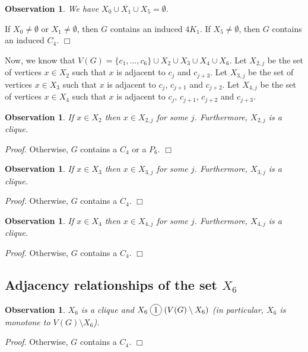 \documentclass[12pt]{article}
\newcommand*\circled[1]{\tikz[baseline=(char.base)]{
		\node[shape=circle,draw,inner sep=2pt] (char) {#1};}}
\newtheorem{Observation}[Theorem]{Observation}
\newcommand{\join}{\; \circled{1} \;}
\newcommand{\qed}{\hfill $\Box$}
\begin{document}
	
	\begin{Observation}\label{obs:X-empty}
		We have $X_0 \cup X_1 \cup X_5 = \emptyset$. 
	\end{Observation}
	 If $X_0 \not= \emptyset$ or $X_1 \not= \emptyset$, then $G$ contains an induced $4K_1$. If $X_5 \not= \emptyset$, then $G$ contains an induced $C_4$. \qed
	
	Now, we know that $V(G) = \{c_1, \dots, c_6\} \cup  X_2 \cup X_3 \cup X_4 \cup X_6$.  Let $X_{2, j}$ be the set  of vertices  $x \in X_2$ such that $x$ is adjacent to  $c_j$ and $c_{j+3}$.  Let $X_{3,j}$ be the set of vertices $x \in X_3$ such that $x$ is adjacent to  $c_j$, $c_{j+1}$ and  $c_{j+2}$.  Let $X_{4,j}$ be the set of vertices $x \in X_4$ such that $x$ is adjacent to  $c_j$, $c_{j+1}$, $c_{j+2}$ and $c_{j+3}$. 
	
	\begin{Observation}\label{obs:X2}
		If $x \in X_2$ then $x \in X_{2,j}$ for some $j$. Furthermore, $X_{2,j}$ is a clique. 
	\end{Observation}
	{\it Proof.} Otherwise, $G$ contains a $C_4$ or a $P_6$. \qed
	
	\begin{Observation}\label{obs:X3}
		If $x \in X_3$ then $x \in X_{3,j}$ for some $j$. Furthermore, $X_{3,j}$ is a clique.
	\end{Observation}
	{\it Proof.} Otherwise, $G$ contains a $C_4$. \qed
	
	\begin{Observation}\label{obs:X4}
		If $x \in X_4$ then $x \in X_{4,j}$ for some $j$. Furthermore, $X_{4,j}$ is a clique.
	\end{Observation}
	{\it Proof.} Otherwise, $G$ contains a $C_4$. \qed
	
	
	\subsection{Adjacency relationships of the set $X_6$}\label{sec:X6}
	
	\begin{Observation}\label{obs:AdjX6}
		$X_6$ is a clique and $X_{6} \join (V(G) \setminus X_6)$  (in particular, $X_6$ is monotone to $V(G) \setminus X_6$). 
	\end{Observation} 
	{\it Proof}. Otherwise, $G$ contains a $C_4$. \qed
	
	
\end{document}
